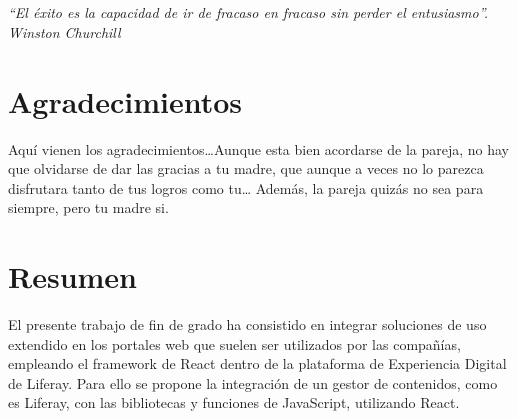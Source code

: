 \documentclass[a4paper, 12pt]{book}
\begin{document}
\newpage
\mbox{}
\thispagestyle{empty} %




\chapter*{}
\begin{flushright}
\textit{``El éxito es la capacidad de ir de fracaso en fracaso sin perder el entusiasmo''.\\ 
Winston Churchill}
\end{flushright}


\chapter*{Agradecimientos}

Aquí vienen los agradecimientos\ldots Aunque esta bien acordarse de la pareja, no hay que olvidarse de dar las gracias a tu madre, que aunque a veces no lo parezca disfrutara tanto de tus logros como tu\ldots 
Además, la pareja quizás no sea para siempre, pero tu madre si.


\chapter*{Resumen}
El presente trabajo de fin de grado ha consistido en integrar soluciones de uso extendido en los portales web que suelen ser utilizados por las compañías, empleando el framework de React dentro de la plataforma de Experiencia Digital de Liferay. Para ello se propone la integración de un gestor de contenidos, como es Liferay, con las bibliotecas y funciones de JavaScript, utilizando React.
\end{document}
